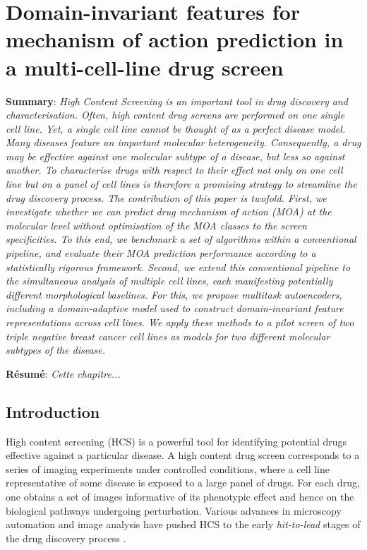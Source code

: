 
\chapter{Domain-invariant features for mechanism of action prediction in a multi-cell-line drug screen} %

\label{Chapter3} %


\textbf{Summary}: \emph{High Content Screening is an important tool in drug discovery and characterisation. Often, high content drug screens are performed on one single cell line. Yet, a single cell line cannot be thought of as a perfect disease model. Many diseases feature an important molecular heterogeneity. Consequently, a drug may be effective against one molecular subtype of a disease, but less so against another. To characterise drugs with respect to their effect not only on one cell line but on a panel of cell lines is therefore a promising strategy to streamline the drug discovery process. The contribution of this paper is twofold. First, we investigate whether we can predict drug mechanism of action (MOA) at the molecular level without optimisation of the MOA classes to the screen specificities. To this end, we benchmark a set of algorithms within a conventional pipeline, and evaluate their MOA prediction performance according to a statistically rigorous framework. Second, we extend this conventional pipeline to the simultaneous analysis of multiple cell lines, each manifesting potentially different morphological baselines. For this, we propose multitask autoencoders, including a domain-adaptive model used to construct domain-invariant feature representations across cell lines. We apply these methods to a pilot screen of two triple negative breast cancer cell lines as models for two different molecular subtypes of the disease.}

\textbf{R\'esum\'e}: \emph{Cette chapitre...}

\section{Introduction}
High content screening (HCS) is a powerful tool for identifying potential drugs effective against a particular disease. A high content drug screen corresponds to a series of imaging experiments under controlled conditions, where a cell line representative of some disease is exposed to a large panel of drugs. For each drug, one obtains a set of images informative of its phenotypic effect and hence on the biological pathways undergoing perturbation. Various advances in microscopy automation and image analysis have pushed HCS to the early \emph{hit-to-lead} stages of the drug discovery process \cite{haney2006high}.

